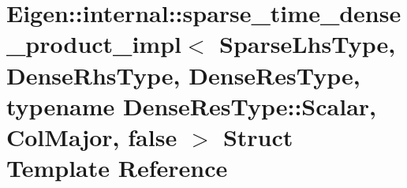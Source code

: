 \hypertarget{struct_eigen_1_1internal_1_1sparse__time__dense__product__impl_3_01_sparse_lhs_type_00_01_dense_67299fc86a44049a87b7e209695d23ff}{}\section{Eigen\+::internal\+::sparse\+\_\+time\+\_\+dense\+\_\+product\+\_\+impl$<$ Sparse\+Lhs\+Type, Dense\+Rhs\+Type, Dense\+Res\+Type, typename Dense\+Res\+Type\+::Scalar, Col\+Major, false $>$ Struct Template Reference}
\label{struct_eigen_1_1internal_1_1sparse__time__dense__product__impl_3_01_sparse_lhs_type_00_01_dense_67299fc86a44049a87b7e209695d23ff}
